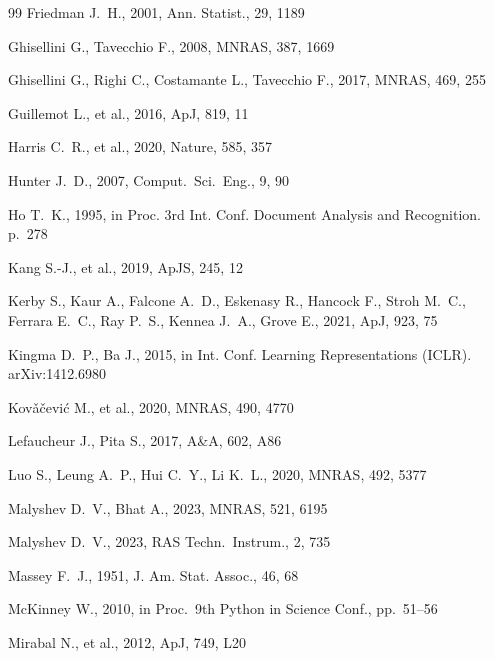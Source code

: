 \documentclass[fleqn,12pt]{article}
\begin{document}
\begin{thebibliography}{99}
Friedman J.~H., 2001, Ann. Statist., 29, 1189

Ghisellini G., Tavecchio F., 2008, MNRAS, 387, 1669

Ghisellini G., Righi C., Costamante L., Tavecchio F.,
  2017, MNRAS, 469, 255

Guillemot L., et al., 2016, ApJ, 819, 11

Harris C.~R., et al., 2020, Nature, 585, 357

Hunter J.~D., 2007, Comput.\ Sci.\ Eng., 9, 90

Ho T.~K., 1995, in Proc. 3rd Int. Conf. Document Analysis and
  Recognition. p.~278

Kang S.-J., et al., 2019, ApJS, 245, 12

Kerby S., Kaur A., Falcone A.~D., Eskenasy R., Hancock F., Stroh M.~C.,
  Ferrara E.~C., Ray P.~S., Kennea J.~A., Grove E., 2021, ApJ, 923, 75

Kingma D.~P., Ba J., 2015, in Int. Conf. Learning Representations
  (ICLR). arXiv:1412.6980

Kov\v{a}\v{c}evi\'{c} M., et al., 2020, MNRAS, 490, 4770

Lefaucheur J., Pita S., 2017, A\&A, 602, A86

Luo S., Leung A.~P., Hui C.~Y., Li K.~L., 2020, MNRAS, 492, 5377

Malyshev D.~V., Bhat A., 2023, MNRAS, 521, 6195

Malyshev D.~V., 2023, RAS Techn.\ Instrum., 2, 735

Massey F.~J., 1951, J. Am. Stat. Assoc., 46, 68

McKinney W., 2010, in Proc.\ 9th Python in Science Conf., pp.~51--56

Mirabal N., et al., 2012, ApJ, 749, L20


\end{thebibliography}
\end{document}
